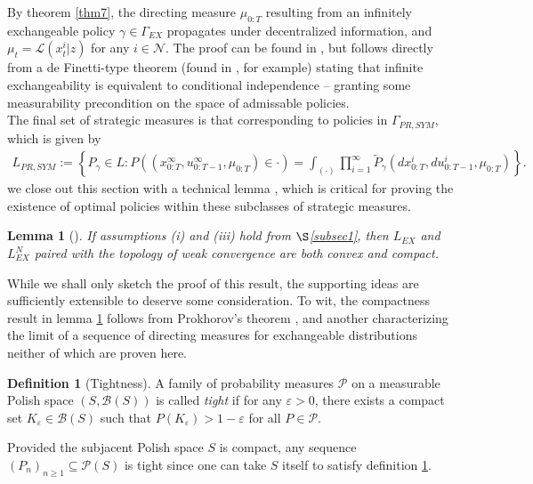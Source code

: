 \documentclass[12pt, oneside]{report}
\newcommand{\1}[1]{\mathbbm{1}_{\{#1\}}}
\newcommand{\mc}[1]{\mathcal{#1}}
\newtheorem{lemma}[theorem]{Lemma}
\theoremstyle{definition}
\newtheorem{definition}[theorem]{Definition}
\begin{document}
By theorem \ref{thm7}, the directing measure $\mu_{0:T}$ resulting from an infinitely exchangeable policy $\gamma\in\Gamma_{EX}$ propagates under decentralized information, and $\mu_t=\mc{L}(x^i_t|z)$ for any $i\in\mc{N}$. The proof can be found
in \cite[theorem 3.2]{Sanjari_Saldi_Yüksel_2024}, but follows directly from a de Finetti-type theorem (found in \cite[theorem 1.1]{Kallenberg_2005}, for example) stating that infinite exchangeability is equivalent
to conditional independence -- granting some measurability precondition on the space of admissable policies.\\[5pt]
\indent The final set of strategic measures is that corresponding to policies in $\Gamma_{PR,\mathit{SYM}}$, which is given by
\begin{align}
    L_{PR,\mathit{SYM}}:=\left\{P_\gamma\in L:P((x^\infty_{0:T},u^\infty_{0:T-1},\mu_{0:T})\in\cdot)=\int_{(\cdot)}\prod_{i=1}^\infty\widetilde{P}_\gamma(dx^i_{0:T},du^i_{0:T-1},\mu_{0:T})\right\}.
\end{align}
we close out this section with a technical lemma \cite[lemma 3]{Sanjari_Saldi_Yüksel_2024}, which is critical for proving the existence of optimal policies within these subclasses of strategic measures.
\begin{lemma}[{\cite[lemma 3]{Sanjari_Saldi_Yüksel_2024}}]\label{lem4}
    If assumptions (i) and (iii) hold from $\S$\ref{subsec1}, then $L_{EX}$ and $L^N_{EX}$ paired with the topology of weak convergence are both convex and compact.
\end{lemma}
While we shall only sketch the proof of this result, the supporting ideas are sufficiently extensible to deserve some consideration. To wit, the compactness result in lemma \ref{lem4} follows from Prokhorov's theorem
\cite[1.12]{Prokhorov_1956},\cite[theorem 9.3.3]{Dudley_2002} and another characterizing the limit of a sequence of directing measures for exchangeable distributions \cite[proposition 7.20]{Aldous_Ibragimov_1985} neither of which are proven here.
\begin{definition}[Tightness]\label{def34}
    A family of probability measures $\mc{P}$ on a measurable Polish space $(S,\mc{B}(S))$ is called \textit{tight} if for any $\varepsilon>0$, there exists a compact set $K_\varepsilon\in\mc{B}(S)$ such that
    $P(K_\varepsilon)>1-\varepsilon$ for all $P\in\mc{P}$.
\end{definition}
Provided the subjacent Polish space $S$ is compact, any sequence $(P_n)_{n\geq 1}\subseteq\mc{P}(S)$ is tight since one can take $S$ itself to satisfy definition \ref{def34}. 
\end{document}
